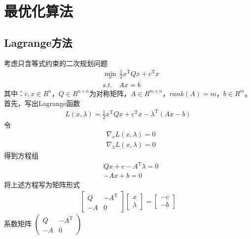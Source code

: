 \section{最优化算法}
    \subsection{Lagrange方法}
        \par
        考虑只含等式约束的二次规划问题
        \begin{align*}
          & \mathop{\min}\limits_{x}\  \frac 12x^\mathrm{T} Qx+c^\mathrm{T} x\\
          & s.t.\quad Ax=b
        \end{align*}
        其中：$c,x \in R^n$，$Q \in R^{n \times n}$为对称矩阵，$A \in R^{m \times n}$，$rank(A)=m$，$b \in R^m$。首先，写出Lagrange函数
        \begin{align*}
         L(x,\lambda)=\frac{1}{2}x^\mathrm{T} Qx+c^\mathrm{T} x-{\lambda}^\mathrm{T} (Ax-b)
        \end{align*}
        令
        \begin{align*}
         &{\nabla}_xL(x,\lambda)=0\\
         &{\nabla}_{\lambda}L(x,\lambda)=0
        \end{align*}
        得到方程组
        \begin{align*}
         &Qx+c-A^\mathrm{T} \lambda=0\\
         &-Ax+b=0
        \end{align*}
        将上述方程写为矩阵形式
        \begin{align}
        \label{最优化算法1}
        \begin{bmatrix} Q & -A^\mathrm{T}  \\
        -A & 0 \end{bmatrix}\begin{bmatrix} x\\\lambda \end{bmatrix}=\begin{bmatrix}-c \\ -b \end{bmatrix}
        \end{align}
        系数矩阵
        \begin{math}
        \left(
        \begin{smallmatrix} Q & -A^\mathrm{T}  \\
        -A & 0 \end{smallmatrix}
        \right)
        \end{math}
